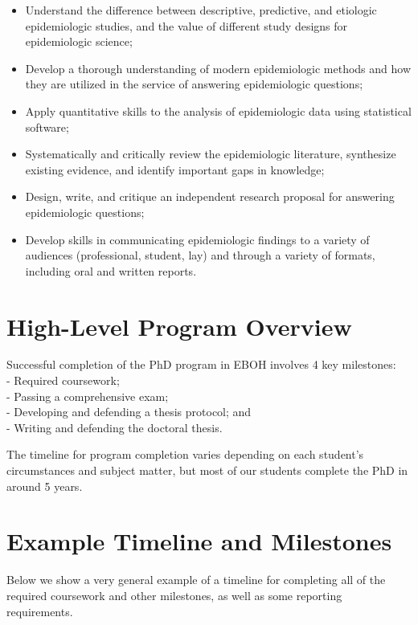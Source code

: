 \documentclass[
  letterpaper,
  DIV=11,
  numbers=noendperiod]{scrreprt}
\providecommand{\tightlist}{%
  \setlength{\itemsep}{0pt}\setlength{\parskip}{0pt}}
\begin{document}
\begin{itemize}
\tightlist
\item
  Understand the difference between descriptive, predictive, and
  etiologic epidemiologic studies, and the value of different study
  designs for epidemiologic science;
\item
  Develop a thorough understanding of modern epidemiologic methods and
  how they are utilized in the service of answering epidemiologic
  questions;
\item
  Apply quantitative skills to the analysis of epidemiologic data using
  statistical software;
\item
  Systematically and critically review the epidemiologic literature,
  synthesize existing evidence, and identify important gaps in
  knowledge;
\item
  Design, write, and critique an independent research proposal for
  answering epidemiologic questions;
\item
  Develop skills in communicating epidemiologic findings to a variety of
  audiences (professional, student, lay) and through a variety of
  formats, including oral and written reports.
\end{itemize}

\section{High-Level Program Overview}\label{high-level-program-overview}

Successful completion of the PhD program in EBOH involves 4 key
milestones:\\
- Required coursework;\\
- Passing a comprehensive exam;\\
- Developing and defending a thesis protocol; and\\
- Writing and defending the doctoral thesis.

The timeline for program completion varies depending on each student's
circumstances and subject matter, but most of our students complete the
PhD in around 5 years.

\section{Example Timeline and
Milestones}\label{example-timeline-and-milestones}

Below we show a very general example of a timeline for completing all of
the required coursework and other milestones, as well as some reporting
requirements.
\end{document}
